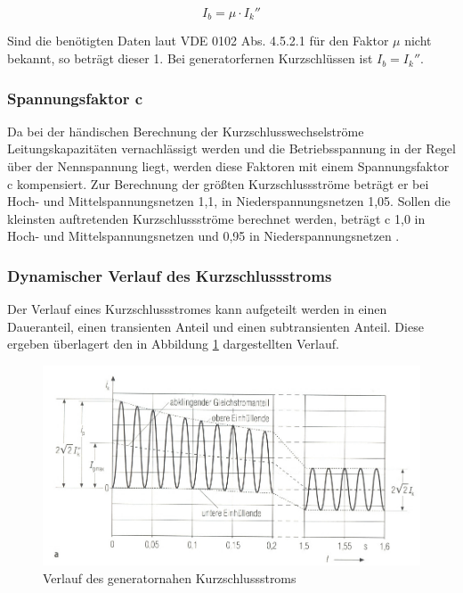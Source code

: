 \documentclass{scrartcl}
\begin{document}
\begin{onehalfspace}
\begin{equation}
I_b =  \mu \cdot I_k''
\end{equation}

Sind die benötigten Daten laut VDE 0102 Abs. 4.5.2.1 für den Faktor $\mu$ nicht bekannt, so beträgt dieser 1. Bei generatorfernen Kurzschlüssen ist $I_b = I_k''$.


\subsubsection{Spannungsfaktor c}
Da bei der händischen Berechnung der Kurzschlusswechselströme Leitungskapazitäten vernachlässigt werden und die Betriebsspannung in der Regel über der Nennspannung liegt, werden diese Faktoren mit einem Spannungsfaktor c kompensiert. Zur Berechnung der größten Kurzschlussströme beträgt er bei Hoch- und Mittelspannungsnetzen 1,1, in Niederspannungsnetzen 1,05. Sollen die kleinsten auftretenden Kurzschlussströme berechnet werden, beträgt c 1,0 in Hoch- und Mittelspannungsnetzen und 0,95 in Niederspannungsnetzen \cite[S. 537]{Oeding2011}.

\subsubsection{Dynamischer Verlauf des Kurzschlussstroms}
Der Verlauf eines Kurzschlussstromes kann aufgeteilt werden in einen Daueranteil, einen transienten Anteil und einen subtransienten Anteil. Diese ergeben überlagert den in Abbildung \ref{kss-verlauf-nah} dargestellten Verlauf.

	\begin{figure}[H]
	\centering
	\includegraphics[scale=1.2]{img/kurzschlussstromverlauf-nah.jpg}
	\caption{Verlauf des generatornahen Kurzschlussstroms \cite[S. 522]{Oeding2011}}
	\label{kss-verlauf-nah}
	\end{figure}


\end{onehalfspace}
\end{document}
